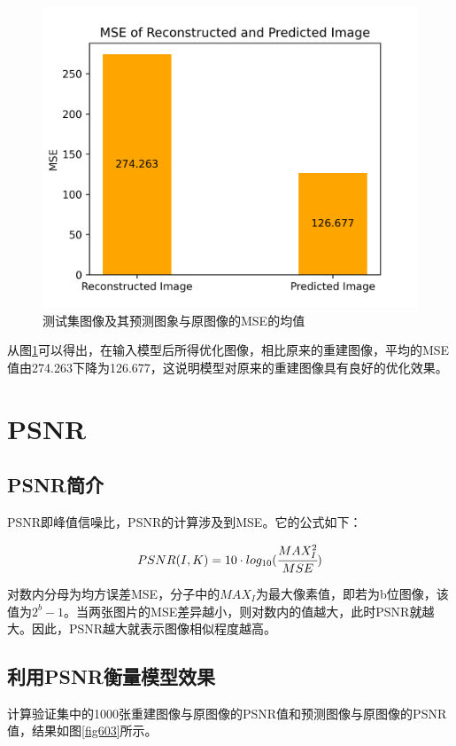 \begin{figure}[h]
	\centering
	\includegraphics[width=0.75\columnwidth]{image/chap06/img602.png}
	\caption{测试集图像及其预测图象与原图像的MSE的均值}
	\label{fig602}
\end{figure}

 从图\ref{fig602}可以得出，在输入模型后所得优化图像，相比原来的重建图像，平均的MSE值由274.263下降为126.677，这说明模型对原来的重建图像具有良好的优化效果。
 
 \section{PSNR}
 \subsection{PSNR简介}
 PSNR即峰值信噪比，PSNR的计算涉及到MSE。它的公式如下：
 
 \begin{equation} \label{602}
 	\begin{aligned}
 		PSNR(I,K)=10\cdot log_{10}(\cfrac{MAX_I^2}{MSE})
 	\end{aligned}
 \end{equation}

对数内分母为均方误差MSE，分子中的$MAX_I$为最大像素值，即若为b位图像，该值为$2^b-1$。当两张图片的MSE差异越小，则对数内的值越大，此时PSNR就越大。因此，PSNR越大就表示图像相似程度越高。

\subsection{利用PSNR衡量模型效果}
 计算验证集中的1000张重建图像与原图像的PSNR值和预测图像与原图像的PSNR值，结果如图\ref{fig603}所示。
 
